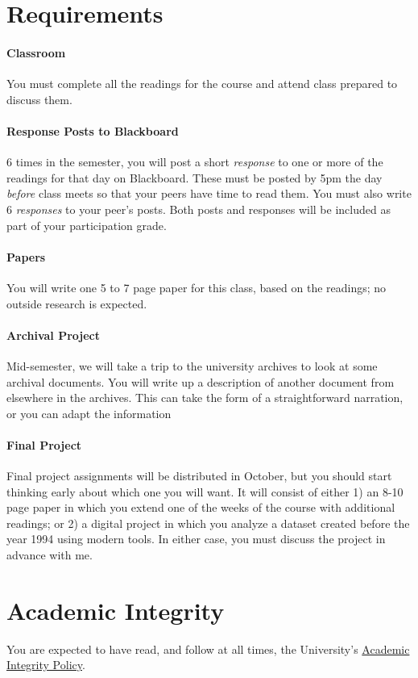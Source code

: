 \section{Requirements}\label{requirements}

\paragraph{Classroom}\label{classroom}

You must complete all the readings for the course and attend class
prepared to discuss them.

\paragraph{Response Posts to
Blackboard}\label{response-posts-to-blackboard}

6 times in the semester, you will post a short \emph{response} to one or
more of the readings for that day on Blackboard. These must be posted by
5pm the day \emph{before} class meets so that your peers have time to
read them. You must also write 6 \emph{responses} to your peer's posts.
Both posts and responses will be included as part of your participation
grade.

\paragraph{Papers}\label{papers}

You will write one 5 to 7 page paper for this class, based on the
readings; no outside research is expected.

\paragraph{Archival Project}\label{archival-project}

Mid-semester, we will take a trip to the university archives to look at
some archival documents. You will write up a description of another
document from elsewhere in the archives. This can take the form of a
straightforward narration, or you can adapt the information

\paragraph{Final Project}\label{final-project}

Final project assignments will be distributed in October, but you should
start thinking early about which one you will want. It will consist of
either 1) an 8-10 page paper in which you extend one of the weeks of the
course with additional readings; or 2) a digital project in which you
analyze a dataset created before the year 1994 using modern tools. In
either case, you must discuss the project in advance with me.

\section{Academic Integrity}\label{academic-integrity}

You are expected to have read, and follow at all times, the University's
\href{http://www.northeastern.edu/osccr/academicintegrity/index.html}{Academic
Integrity Policy}.
